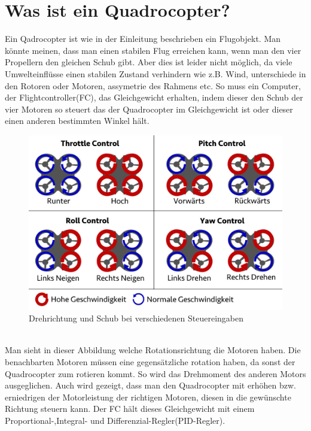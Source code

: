\documentclass[12pt,a4paper, ngerman]{article}
\begin{document}
\section{Was ist ein Quadrocopter?}
Ein Qadrocopter ist wie in der Einleitung beschrieben ein Flugobjekt. Man könnte meinen, dass man einen stabilen Flug erreichen kann, wenn man den vier Propellern den gleichen Schub gibt. Aber dies ist leider nicht möglich, da viele Umwelteinflüsse einen stabilen Zustand verhindern wie z.B. Wind, unterschiede in den Rotoren oder Motoren, assymetrie des Rahmens etc. So muss ein Computer, der Flightcontroller(FC), das Gleichgewicht erhalten, indem dieser den Schub der vier Motoren so steuert das der Quadrocopter im Gleichgewicht ist oder dieser einen anderen bestimmten Winkel hält.\\
\begin{figure}[h]
\centering
\includegraphics[width=\textwidth]{MotionDE.jpg}
\caption[https://fpvracing.ch/de/content/7-grundsatzliche-funktion-quadrocopter-multicopter]{Drehrichtung und Schub bei verschiedenen Steuereingaben }
\end{figure}\\
Man sieht in dieser Abbildung welche Rotationsrichtung die Motoren haben. Die benachbarten Motoren müssen eine gegensätzliche rotation haben, da sonst der Quadrocopter zum rotieren kommt. So wird das Drehmoment des anderen Motors ausgeglichen. Auch wird gezeigt, dass man den Quadrocopter mit erhöhen bzw. erniedrigen der Motorleistung der richtigen Motoren, diesen in die gewünschte Richtung steuern kann. Der FC hält dieses Gleichgewicht mit einem Proportional-,Integral- und Differenzial-Regler(PID-Regler).
\end{document}
